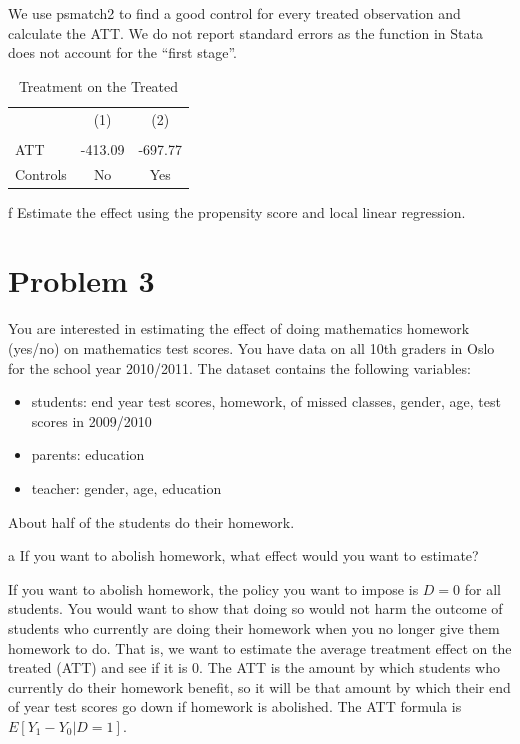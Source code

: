 \documentclass{article}
\begin{document}
\begin{solution}
We use psmatch2 to find a good control for every treated observation and calculate the ATT. We do not report standard errors as the function in Stata does not account for the ``first stage''. 
\begin{table}[htb]
    \centering
    \caption{Treatment on the Treated}
    \label{tab:my_label}
    \begin{tabular}{lcc} \hline\hline 
 & (1) & (2) \\ \\ \hline
     ATT & -413.09 & -697.77  \\ \hline
     Controls & No & Yes \\ \hline\hline
\end{tabular}
\end{table}

\end{solution}

\begin{problem}{f}
Estimate the effect using the propensity score and local linear regression.
\end{problem}
\begin{solution}
\end{solution}

\newpage
\section*{Problem 3}
You are interested in estimating the effect of doing mathematics homework (yes/no) on mathematics test scores. You have data on all 10th graders in Oslo for the school year 2010/2011. The dataset contains the following variables:
\begin{itemize}
    \item students: end year test scores, homework, of missed classes, gender, age, test scores in 2009/2010
    \item parents: education
    \item teacher: gender, age, education
\end{itemize}
About half of the students do their homework.

\begin{problem}{a}
If you want to abolish homework, what effect would you want to estimate?
\end{problem}
\begin{solution}
If you want to abolish homework, the policy you want to impose is $D=0$ for all students. You would want to show that doing so would not harm the outcome of students who currently are doing their homework when you no longer give them homework to do. That is, we want to estimate the average treatment effect on the treated (ATT) and see if it is 0. The ATT is the amount by which students who currently do their homework benefit, so it will be that amount by which their end of year test scores go down if homework is abolished. The ATT formula is $E[Y_1-Y_0|D=1]$.
\end{solution}
\end{document}
